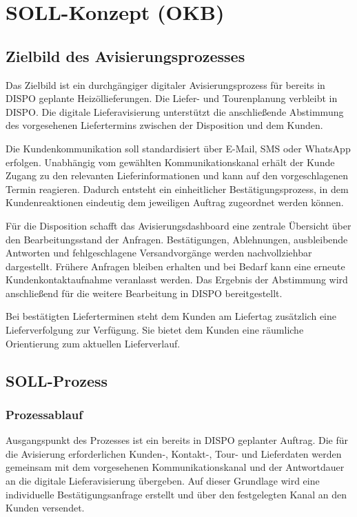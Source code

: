 \section{SOLL-Konzept (OKB)}

\subsection{Zielbild des Avisierungsprozesses}

Das Zielbild ist ein durchgängiger digitaler Avisierungsprozess
für bereits in DISPO geplante Heizöllieferungen. Die
Liefer- und Tourenplanung verbleibt in DISPO. Die
digitale Lieferavisierung unterstützt die anschließende
Abstimmung des vorgesehenen Liefertermins zwischen der
Disposition und dem Kunden.

Die Kundenkommunikation soll standardisiert über E-Mail, SMS
oder WhatsApp erfolgen. Unabhängig vom gewählten
Kommunikationskanal erhält der Kunde Zugang zu den relevanten
Lieferinformationen und kann auf den vorgeschlagenen Termin
reagieren. Dadurch entsteht ein einheitlicher
Bestätigungsprozess, in dem Kundenreaktionen eindeutig dem
jeweiligen Auftrag zugeordnet werden können.

Für die Disposition schafft das Avisierungsdashboard eine
zentrale Übersicht über den Bearbeitungsstand der Anfragen.
Bestätigungen, Ablehnungen, ausbleibende Antworten und
fehlgeschlagene Versandvorgänge werden nachvollziehbar
dargestellt. Frühere Anfragen bleiben erhalten und bei Bedarf
kann eine erneute Kundenkontaktaufnahme veranlasst werden. Das
Ergebnis der Abstimmung wird anschließend für die weitere
Bearbeitung in DISPO bereitgestellt.

Bei bestätigten Lieferterminen steht dem Kunden am Liefertag zusätzlich eine Lieferverfolgung zur Verfügung.
Sie bietet dem Kunden eine räumliche Orientierung zum aktuellen Lieferverlauf.

\subsection{SOLL-Prozess}

\subsubsection{Prozessablauf}

Ausgangspunkt des Prozesses ist ein bereits in DISPO
geplanter Auftrag. Die für die Avisierung erforderlichen
Kunden-, Kontakt-, Tour- und Lieferdaten werden gemeinsam mit
dem vorgesehenen Kommunikationskanal und der Antwortdauer an
die digitale Lieferavisierung übergeben. Auf dieser Grundlage
wird eine individuelle Bestätigungsanfrage erstellt und über
den festgelegten Kanal an den Kunden versendet.

